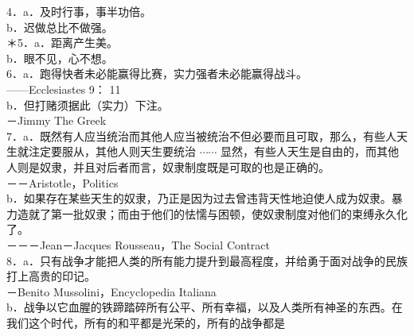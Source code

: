 4．a．及时行事，事半功倍。\\
b．迟做总比不做强。\\
＊5．a．距离产生美。\\
b．眼不见，心不想。\\
6．a．跑得快者未必能赢得比赛，实力强者未必能赢得战斗。\\
——Ecclesiastes 9： 11\\
b．但打赌须据此（实力）下注。\\
－Jimmy The Greek\\
7．a．既然有人应当统治而其他人应当被统治不但必要而且可取，那么，有些人天生就注定要服从，其他人则天生要统治 $\cdots \cdots$ 显然，有些人天生是自由的，而其他人则是奴隶，并且对后者而言，奴隶制度既是可取的也是正确的。\\
－－Aristotle，Politics\\
b．如果存在某些天生的奴隶，乃正是因为过去曾违背天性地迫使人成为奴隶。暴力造就了第一批奴隶；而由于他们的怯懦与困顿，使奴隶制度对他们的束缚永久化了。\\
－－－Jean－Jacques Rousseau，The Social Contract\\
8．a．只有战争才能把人类的所有能力提升到最高程度，并给勇于面对战争的民族打上高贵的印记。\\
－Benito Mussolini，Encyclopedia Italiana\\
b．战争以它血腥的铁蹄踏碎所有公平、所有幸福，以及人类所有神圣的东西。在我们这个时代，所有的和平都是光荣的，所有的战争都是

